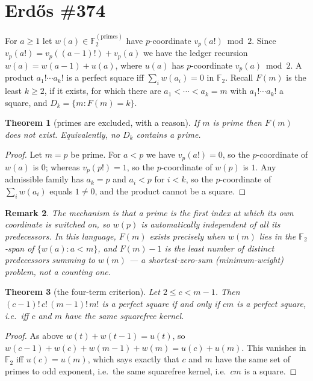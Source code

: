 \documentclass[11pt]{article}
\newtheorem{theorem}{Theorem}
\newtheorem{remark}[theorem]{Remark}
\begin{document}
\section{Erd\H{o}s \#374}\label{sec:374}

For $a\ge1$ let $w(a)\in\mathbb F_2^{(\text{primes})}$ have $p$-coordinate
$v_p(a!)\bmod 2$.  Since $v_p(a!)=v_p((a-1)!)+v_p(a)$ we have the ledger recursion
$w(a)=w(a-1)+u(a)$, where $u(a)$ has $p$-coordinate $v_p(a)\bmod2$.  A product
$a_1!\cdots a_k!$ is a perfect square iff $\sum_iw(a_i)=0$ in $\mathbb F_2$.  Recall
$F(m)$ is the least $k\ge2$, if it exists, for which there are $a_1<\cdots<a_k=m$ with
$a_1!\cdots a_k!$ a square, and $D_k=\{m:F(m)=k\}$.

\begin{theorem}[primes are excluded, with a reason]\label{thm:374prime}
If $m$ is prime then $F(m)$ does not exist.  Equivalently, no $D_k$ contains a prime.
\end{theorem}

\begin{proof}
Let $m=p$ be prime.  For $a<p$ we have $v_p(a!)=0$, so the $p$-coordinate of $w(a)$ is $0$;
whereas $v_p(p!)=1$, so the $p$-coordinate of $w(p)$ is $1$.  Any admissible family has
$a_k=p$ and $a_i<p$ for $i<k$, so the $p$-coordinate of $\sum_iw(a_i)$ equals $1\ne0$, and
the product cannot be a square.
\end{proof}

\begin{remark}
The mechanism is that a prime is the first index at which its own coordinate is switched on,
so $w(p)$ is automatically independent of all its predecessors.  In this language,
$F(m)$ exists precisely when $w(m)$ lies in the $\mathbb F_2$-span of
$\{w(a):a<m\}$, and $F(m)-1$ is the least number of distinct predecessors summing to
$w(m)$ --- a shortest-zero-sum (minimum-weight) problem, not a counting one.
\end{remark}

\begin{theorem}[the four-term criterion]\label{thm:374four}
Let $2\le c<m-1$.  Then $(c{-}1)!\,c!\,(m{-}1)!\,m!$ is a perfect square if and only if
$cm$ is a perfect square, i.e.\ iff $c$ and $m$ have the same squarefree kernel.
\end{theorem}

\begin{proof}
As above $w(t)+w(t-1)=u(t)$, so
$w(c{-}1)+w(c)+w(m{-}1)+w(m)=u(c)+u(m)$.  This vanishes in $\mathbb F_2$ iff $u(c)=u(m)$,
which says exactly that $c$ and $m$ have the same set of primes to odd exponent, i.e.\ the
same squarefree kernel, i.e.\ $cm$ is a square.
\end{proof}
\end{document}
